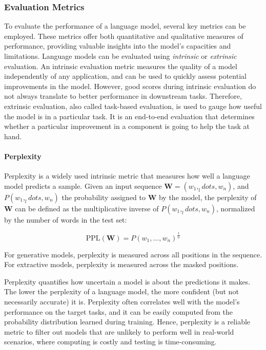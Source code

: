 \subsubsection{Evaluation Metrics}

To evaluate the performance of a language model, several key metrics can be employed. These metrics offer both quantitative and qualitative measures of performance, providing valuable insights into the model's capacities and limitations. Language models can be evaluated using \textit{intrinsic} or \textit{extrinsic} evaluation. An intrinsic evaluation metric measures the quality of a model independently of any application, and can be used to quickly assess potential improvements in the model. However, good scores during intrinsic evaluation do not always translate to better performance in downstream tasks. Therefore, extrinsic evaluation, also called task-based evaluation, is used to gauge how useful the model is in a particular task. It is an end-to-end evaluation that determines whether a particular improvement in a component is going to help the task at hand.


\paragraph{Perplexity} 

Perplexity is a widely used intrinsic metric that measures how well a language model predicts a sample. Given an input sequence $\bm{W} = (w_1, _ldots, w_n)$, and $P(w_1, _ldots, w_n)$ the probability assigned to $\bm{W}$ by the model, the perplexity of $\bm{W}$ can be defined as the multiplicative inverse of $P(w_1, _ldots, w_n)$, normalized by the number of words in the test set:

\begin{equation}
    \text{PPL}(\bm{W}) = P(w_1, \ldots, w_n)^{\frac{1}{n}}
\end{equation}

For generative models, perplexity is measured across all positions in the sequence. For extractive models, perplexity is measured across the masked positions.

Perplexity quantifies how uncertain a model is about the predictions it makes. The lower the perplexity of a language model, the more confident (but not necessarily accurate) it is. Perplexity often correlates well with the model's performance on the target tasks, and it can be easily computed from the probability distribution learned during training. Hence, perplexity is a reliable metric to filter out models that are unlikely to perform well in real-world scenarios, where computing is costly and testing is time-consuming.

